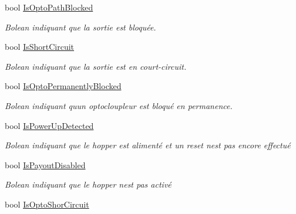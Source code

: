 \begin{DoxyCompactItemize}
bool \mbox{\hyperlink{class_device_library_1_1_c_hopper_aba941b8ab4317792660483f287171363}{Is\+Opto\+Path\+Blocked}}
\begin{DoxyCompactList}\small\item\em Bolean indiquant que la sortie est bloquée. \end{DoxyCompactList}\item 
bool \mbox{\hyperlink{class_device_library_1_1_c_hopper_aa52f0af92ae272576ec14a79c6356e96}{Is\+Short\+Circuit}}
\begin{DoxyCompactList}\small\item\em Bolean indiquant que la sortie est en court-\/circuit. \end{DoxyCompactList}\item 
bool \mbox{\hyperlink{class_device_library_1_1_c_hopper_ad7168dd39fa5f937164d357c3236321d}{Is\+Opto\+Permanently\+Blocked}}
\begin{DoxyCompactList}\small\item\em Bolean indiquant qu\textquotesingle{}un optocloupleur est bloqué en permanence. \end{DoxyCompactList}\item 
bool \mbox{\hyperlink{class_device_library_1_1_c_hopper_a5a9d29bab15e199a614d991b6b860c5a}{Is\+Power\+Up\+Detected}}
\begin{DoxyCompactList}\small\item\em Bolean indiquant que le hopper est alimenté et un reset n\textquotesingle{}est pas encore effectué \end{DoxyCompactList}\item 
bool \mbox{\hyperlink{class_device_library_1_1_c_hopper_a5f728eaab6f916a56b0927cfef1c836f}{Is\+Payout\+Disabled}}
\begin{DoxyCompactList}\small\item\em Bolean indiquant que le hopper n\textquotesingle{}est pas activé \end{DoxyCompactList}\item 
bool \mbox{\hyperlink{class_device_library_1_1_c_hopper_afca797bea58cb663b8b3784df7c9dc65}{Is\+Opto\+Shor\+Circuit}}

\end{DoxyCompactItemize}

